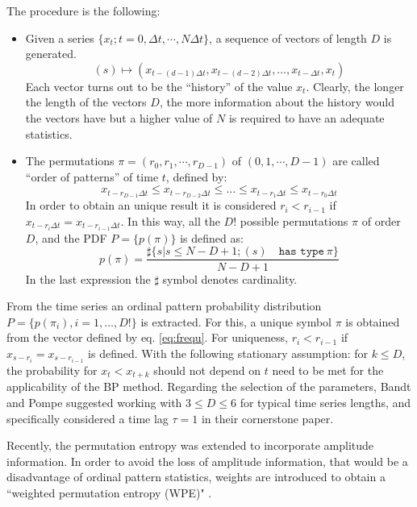 The procedure is the following:
\begin{itemize}[leftmargin=*,labelsep=5.8mm]
\item 	Given a series $\{x_t; t=0, \Delta t, \cdots,N\Delta t \}$, a sequence of vectors of length $D$ is generated.
		\begin{equation}
		(s)\longmapsto\left(x_{t-(d-1)\Delta t},x_{t-(d-2)\Delta t},\dots,x_{t-\Delta t},x_{t}\right) 
		\label{eq:vectores}
		\end{equation}
		Each vector turns out to be the ``history'' of the value $x_t$. Clearly, the longer the length of the vectors $D$, the more information about the history would the vectors have but a higher value of $N$ is required to have an adequate statistics. 
\item 	The permutations $\pi=(r_0, r_1, \cdots, r_{D-1})$ of $(0, 1, \cdots, D-1)$ are called ``order of patterns'' of time $t$, defined by:
		\begin{equation}
		\label{eq:permuta}
		x_{t-r_{D-1}\Delta t}\le x_{t-r_{D-2}\Delta t}\le\dots\le x_{t-r_{1}\Delta t}\le x_{t-r_0\Delta t}
		\end{equation}
		In order to obtain an unique result it is considered $r_i<r_{i-1}$ if $x_{t-r_{i}\Delta t}=x_{t-r_{i-1}\Delta t}$.
		In this way, all the $D!$ possible permutations $\pi$ of order $D$, and the PDF $P=\{p(\pi)\}$ is defined as:
		\begin{equation}
		\label{eq:frequ}
		p(\pi)=\frac{\sharp \{s|s\leq N-D+1; (s) \quad \texttt{has type}~\pi\}}{N-D+1}
		\end{equation}
		In the last expression the $\sharp$ symbol denotes cardinality.
\end{itemize}

From the time series an ordinal pattern probability distribution $P = \{ p(\pi_i), i = 1, \dots, D! \}$ is extracted.
For this, a unique symbol $\pi$ is obtained from the vector defined by eq. \ref{eq:frequ}.
For uniqueness, $r_i < r_{i-1}$ if $x_{s-r_{i}} = x_{s-r_{i-1}}$ is defined.
With the following stationary assumption: for $k \leq D$, the probability for $x_t < x_{t+k}$ should not depend on $t$ need to be met for the applicability of the BP method.
Regarding the selection of the parameters, Bandt and Pompe suggested working with $3 \leq D \leq 6$ for typical time series lengths, and specifically considered a time lag $\tau = 1$ in their cornerstone paper.

Recently, the permutation entropy was extended to incorporate amplitude information.
In order to avoid the loss of amplitude information, that would be a disadvantage of ordinal pattern statistics, weights are introduced to obtain a ``weighted permutation entropy (WPE)" \cite{Fadlallah2013}.

